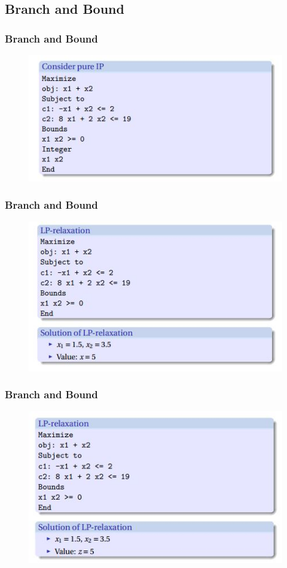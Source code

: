 \documentclass{beamer}
\begin{document}
\subsection{Branch and Bound}
\begin{frame}
	\frametitle{Branch and Bound}
	\Large
	\begin{figure}
\centering
\includegraphics[width=0.7\linewidth]{BranchBound1}
\end{figure}

\end{frame}
\begin{frame}
	\frametitle{Branch and Bound}
	\Large
	\begin{figure}
		\centering
		\includegraphics[width=0.7\linewidth]{BranchBound2}
	\end{figure}
	
\end{frame}
\begin{frame}
	\frametitle{Branch and Bound}
	\Large
	\begin{figure}
		\centering
		\includegraphics[width=0.7\linewidth]{BranchBound3}
	\end{figure}
	
\end{frame}
\end{document}
